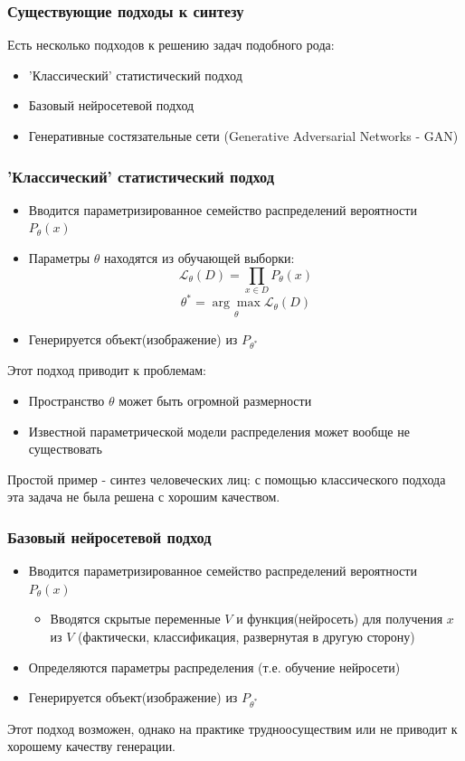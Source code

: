 \documentclass[12pt]{beamer}
\begin{document}
\begin{frame}\frametitle{Существующие подходы к синтезу}
	Есть несколько подходов к решению задач подобного рода:
	\begin{itemize}
		\item 'Классический' статистический подход
		\item Базовый нейросетевой подход
		\item Генеративные состязательные сети (Generative Adversarial Networks - GAN)
	\end{itemize}
\end{frame}

\begin{frame}\frametitle{'Классический' статистический подход}
	\begin{itemize}
		\item Вводится параметризированное семейство распределений вероятности $P_{\theta}(x)$
		\item Параметры $\theta$ находятся из обучающей выборки:
		$$ \mathcal{L}_{\theta}(D) = \prod_{x \in D} P_{\theta}(x) $$
		$$ \theta^{*} = \underset{\theta}{\arg\max} \mathcal{L}_{\theta}(D)$$
		\item Генерируется объект(изображение) из $ P_{\theta^{*}}$
	\end{itemize}
	Этот подход приводит к проблемам:
	\begin{itemize}
		\item Пространство $\theta$ может быть огромной размерности
		\item Известной параметрической модели распределения может вообще не существовать
	\end{itemize}
	Простой пример - синтез человеческих лиц: с помощью классического подхода эта задача не была решена с хорошим качеством.
\end{frame}

\begin{frame}\frametitle{Базовый нейросетевой подход}
	\begin{itemize}
		\item Вводится параметризированное семейство распределений вероятности $P_{\theta}(x)$
		\begin{itemize}
			\item Вводятся скрытые переменные $V$ и функция(нейросеть) для получения $x$ из $V$ (фактически, классификация, развернутая в другую сторону)
		\end{itemize}
		\item Определяются параметры распределения (т.е. обучение нейросети)
		\item Генерируется объект(изображение) из $ P_{\theta^{*}}$
	\end{itemize}
	Этот подход возможен, однако на практике трудноосуществим или не приводит к хорошему качеству генерации.
\end{frame}
\end{document}
